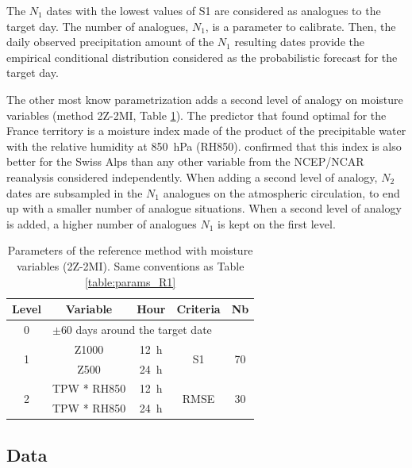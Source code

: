 \documentclass[review]{elsarticle}
\begin{document}
The $N_{1}$ dates with the lowest values of S1 are considered as analogues to the target day. The number of analogues, $N_{1}$, is a parameter to calibrate. Then, the daily observed precipitation amount of the $N_{1}$ resulting dates provide the empirical conditional distribution considered as the probabilistic forecast for the target day.

The other most know parametrization adds a second level of analogy on moisture variables (method 2Z-2MI, Table \ref{table:params_R2}). The predictor that \citet{Bontron2004} found optimal for the France territory is a moisture index made of the product of the precipitable water with the relative humidity at 850~hPa (RH850). \cite{Horton2012a} confirmed that this index is also better for the Swiss Alps than any other variable from the NCEP/NCAR reanalysis considered independently. When adding a second level of analogy, $N_{2}$ dates are subsampled in the $N_{1}$ analogues on the atmospheric circulation, to end up with a smaller number of analogue situations. When a second level of analogy is added, a higher number of analogues $N_{1}$ is kept on the first level.

\begin{table}[htb]
	\caption{Parameters of the reference method with moisture variables (2Z-2MI). Same conventions as Table \ref{table:params_R1}}
	\footnotesize
	\begin{center}
		\begin{tabular}{ccccc}
			\hline 
			Level & Variable & Hour & Criteria & Nb \\ 
			\hline 
			0 & \multicolumn{4}{l}{$\pm 60$ days around the target date} \\
			\hline 
			\multirow{2}{*}{1} & Z1000 & 12~h & \multirow{2}{*}{S1} & \multirow{2}{*}{70} \\
			& Z500 & 24~h & & \\ 
			\hline
			\multirow{2}{*}{2} & TPW * RH850 & 12~h & \multirow{2}{*}{RMSE} & \multirow{2}{*}{30} \\
			& TPW * RH850 & 24~h & & \\ 
			\hline 
		\end{tabular} 
	\end{center}
	\label{table:params_R2}
\end{table}


\subsection{Data}
\label{sec:data}
\end{document}
